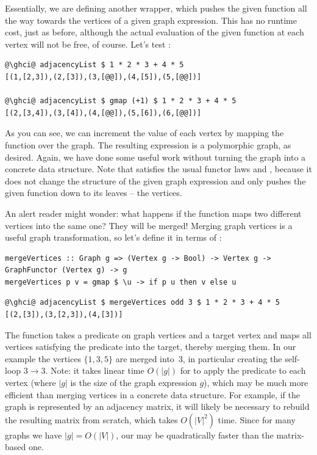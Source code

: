 Essentially, we are defining another  wrapper, which pushes the
given function all the way towards the vertices of a given graph expression.
This has no runtime cost,
just as before, although the actual evaluation of the given function at each
vertex will not be free, of course. Let's test :

\begin{verbatim}
@\ghci@ adjacencyList $ 1 * 2 * 3 + 4 * 5
[(1,[2,3]),(2,[3]),(3,[@@]),(4,[5]),(5,[@@])]

@\ghci@ adjacencyList $ gmap (+1) $ 1 * 2 * 3 + 4 * 5
[(2,[3,4]),(3,[4]),(4,[@@]),(5,[6]),(6,[@@])]
\end{verbatim}
\vspace{-1mm}
As you can see, we can increment the value of each vertex by mapping the function
 over the graph. The resulting expression is a polymorphic graph, as desired.
Again, we have done some useful work without turning the graph into a concrete data
structure. Note that  satisfies the usual functor laws
 and , because
it does not change the structure of the given graph expression and only pushes
the given function down to its leaves -- the vertices.

An alert reader might wonder: what happens if the function maps two different
vertices into the same one? They will be merged! Merging graph vertices is
a useful graph transformation, so let's define it in terms of :

\begin{verbatim}
mergeVertices :: Graph g => (Vertex g -> Bool) -> Vertex g -> GraphFunctor (Vertex g) -> g
mergeVertices p v = gmap $ \u -> if p u then v else u
\end{verbatim}
\vspace{-1mm}
\begin{verbatim}
@\ghci@ adjacencyList $ mergeVertices odd 3 $ 1 * 2 * 3 + 4 * 5
[(2,[3]),(3,[2,3]),(4,[3])]
\end{verbatim}
\vspace{-1mm}
The function takes a predicate on graph vertices and a target vertex and
maps all vertices satisfying the predicate into the target, thereby
merging them. In our example the  vertices $\{1, 3, 5\}$ are merged
into~3, in particular creating the self-loop $3 \rightarrow 3$. Note: it takes
linear time $O(|g|)$ for  to apply the predicate to each vertex
(where $|g|$ is the size of the graph expression $g$), which may be much more efficient
than merging vertices in a concrete data structure. For example, if the graph
is represented by an adjacency matrix, it will likely be necessary to rebuild
the resulting matrix from scratch, which takes $O(|V|^2)$ time. Since for
many graphs we have $|g| = O(|V|)$, our 
may be quadratically faster than the matrix-based one.


